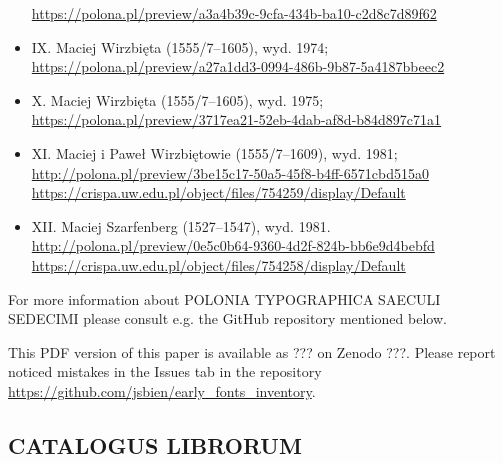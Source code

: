 \documentclass[12pt]{article}
\begin{document}
\begin{itemize}
        \url{https://polona.pl/preview/a3a4b39c-9cfa-434b-ba10-c2d8c7d89f62}
\item IX. Maciej Wirzbięta (1555/7–1605), wyd. 1974;\\ \url{https://polona.pl/preview/a27a1dd3-0994-486b-9b87-5a4187bbeec2}
\item X. Maciej Wirzbięta (1555/7–1605), wyd. 1975;\\ \url{https://polona.pl/preview/3717ea21-52eb-4dab-af8d-b84d897c71a1}
\item XI. Maciej i Paweł Wirzbiętowie (1555/7–1609), wyd. 1981; \\
  \url{http://polona.pl/preview/3be15c17-50a5-45f8-b4ff-6571cbd515a0}\\
  \url{https://crispa.uw.edu.pl/object/files/754259/display/Default}
      \item XII. Maciej Szarfenberg (1527–1547), wyd. 1981.\\
        \url{http://polona.pl/preview/0e5c0b64-9360-4d2f-824b-bb6e9d4bebfd}\\
        {\url{https://crispa.uw.edu.pl/object/files/754258/display/Default}}
      \end{itemize}


      For more information about \textsc{POLONIA TYPOGRAPHICA SAECULI
        SEDECIMI} please consult e.g. the GitHub repository mentioned
      below.

\bigskip

This PDF version of this paper is available as ??? on Zenodo
???. Please report noticed mistakes in the \textsf{Issues} tab in the
repository \url{https://github.com/jsbien/early_fonts_inventory}.


\subsection{CATALOGUS LIBRORUM}
\label{sec:catalogus-librorum}
\end{document}
